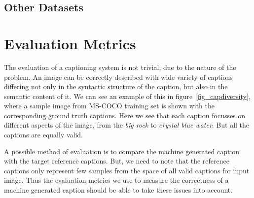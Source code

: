 \subsection{Other Datasets}
\section{Evaluation Metrics}
\label{sec:EvaluationMetrics}
The evaluation of a captioning system is not trivial, due to the
 nature of the problem.
An image can be correctly described with wide variety of captions differing not
only in the syntactic structure of the caption, but also in the semantic content
of it.
We can see an example of this in figure~\ref{fig_capdiversity}, where a sample
image from MS-COCO training set is shown with the corresponding ground truth
captions.
Here we see that each caption focusses on different aspects of the image, from
the \emph{big rock} to \emph{crystal blue water}.
But all the captions are equally valid.

A possible method of evaluation is to compare the machine generated
caption with the target reference captions.
But, we need to note that the reference captions only represent few samples from
the space of all valid captions for input image.
Thus the evaluation metrics we use to measure the correctness of a machine
generated caption should be able to take these issues into account.

